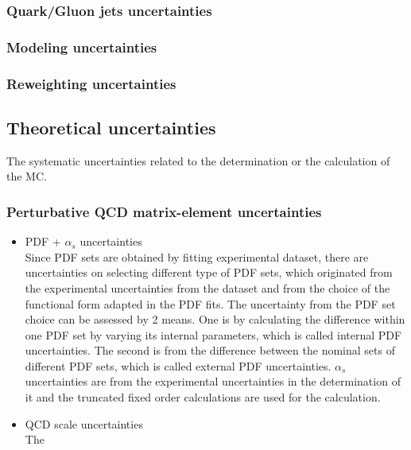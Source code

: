 \subsubsection{Quark/Gluon jets uncertainties}
\subsubsection{Modeling uncertainties}
\subsubsection{Reweighting uncertainties}
\subsection{Theoretical uncertainties}
The systematic uncertainties related to the determination or the calculation of the MC.
\subsubsection{Perturbative QCD matrix-element uncertainties}
\begin{itemize}
      \item PDF + $\alpha_s$ uncertainties\\
      Since PDF sets are obtained by fitting experimental dataset, there are uncertainties on selecting different type of PDF sets, which originated from the experimental uncertainties from the dataset and from the choice of the functional form adapted in the PDF fits.
      The uncertainty from the PDF set choice can be assessed by 2 means. One is by calculating the difference within one PDF set by varying its internal parameters, which is called internal PDF uncertainties. The second is from the difference between the nominal sets of different PDF sets, which is called external PDF uncertainties.
      $\alpha_s$ uncertainties are from the experimental uncertainties in the determination of it and the truncated fixed order calculations are used for the calculation.
      \item QCD scale uncertainties\\
      The 
\end{itemize}
